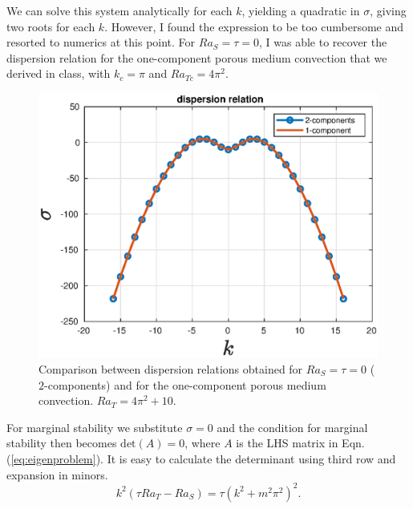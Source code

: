 \documentclass{article}
\begin{document}
We can solve this system analytically for each $k$, yielding a quadratic in $\sigma$, giving two roots for each $k$. However, I found the expression to be too cumbersome and resorted to numerics at this point. For $Ra_{S} = \tau = 0$, I was able to recover the dispersion relation for the one-component porous medium convection that we derived in class, with $k_{c} = \pi$ and $Ra_{Tc} = 4\pi^{2}$.  

\begin{figure}[H]
    \centering
    \includegraphics[scale = 0.8]{Figs/sigma_vs_k_comparison.eps}
    \caption{Comparison between dispersion relations obtained for $Ra_{S} = \tau = 0$ ($2$-components) and for the one-component porous medium convection. $Ra_{T} = 4\pi^{2} + 10$.}
    \label{fig:sigma_vs_k_comparison}
\end{figure}
%
For marginal stability we substitute $\sigma = 0$ and the condition for marginal stability then becomes $\textrm{det}(A) = 0$, where $A$ is the LHS matrix in Eqn.(\ref{eq:eigenproblem}). It is easy to calculate the determinant using third row and expansion in minors.  
\begin{equation}\label{eq:lin_marginal_stab}
 k^{2}(\tau Ra_{T} - Ra_{S}) = \tau (k^{2} + m^{2}\pi^{2})^{2}.
\end{equation}

\end{document}
